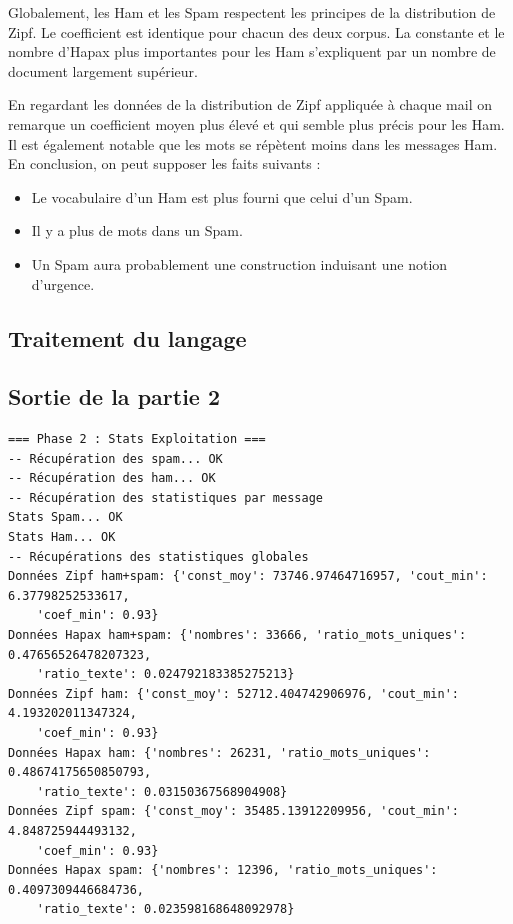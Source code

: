 \documentclass[a4paper,12pt]{article}
\begin{document}
			Globalement, les Ham et les Spam respectent les principes de la distribution de Zipf. Le coefficient est identique pour chacun des deux corpus. La constante et le nombre d'Hapax plus importantes pour les Ham s'expliquent par un nombre de document largement supérieur.
			 
			En regardant les données de la distribution de Zipf appliquée à chaque mail on remarque un coefficient moyen plus élevé et qui semble plus précis pour les Ham. Il est également notable que les mots se répètent moins dans les messages Ham.\\
			
			
			En conclusion, on peut supposer les faits suivants : 
			\begin{itemize}
				\item Le vocabulaire d'un Ham est plus fourni que celui d'un Spam.
				\item Il y a plus de mots dans un Spam.
				\item Un Spam aura probablement une construction induisant une notion d'urgence.
			\end{itemize}
			
		
	\subsection{Traitement du langage}
		


	\newpage
	\subsection{Sortie de la partie 2}
		\begin{verbatim}
=== Phase 2 : Stats Exploitation ===
-- Récupération des spam... OK
-- Récupération des ham... OK
-- Récupération des statistiques par message
Stats Spam... OK
Stats Ham... OK
-- Récupérations des statistiques globales
Données Zipf ham+spam: {'const_moy': 73746.97464716957, 'cout_min': 6.37798252533617, 
	'coef_min': 0.93}
Données Hapax ham+spam: {'nombres': 33666, 'ratio_mots_uniques': 0.47656526478207323, 
	'ratio_texte': 0.024792183385275213}
Données Zipf ham: {'const_moy': 52712.404742906976, 'cout_min': 4.193202011347324, 
	'coef_min': 0.93}
Données Hapax ham: {'nombres': 26231, 'ratio_mots_uniques': 0.48674175650850793, 
	'ratio_texte': 0.03150367568904908}
Données Zipf spam: {'const_moy': 35485.13912209956, 'cout_min': 4.848725944493132, 
	'coef_min': 0.93}
Données Hapax spam: {'nombres': 12396, 'ratio_mots_uniques': 0.4097309446684736, 
	'ratio_texte': 0.023598168648092978}
		\end{verbatim}
\end{document}
